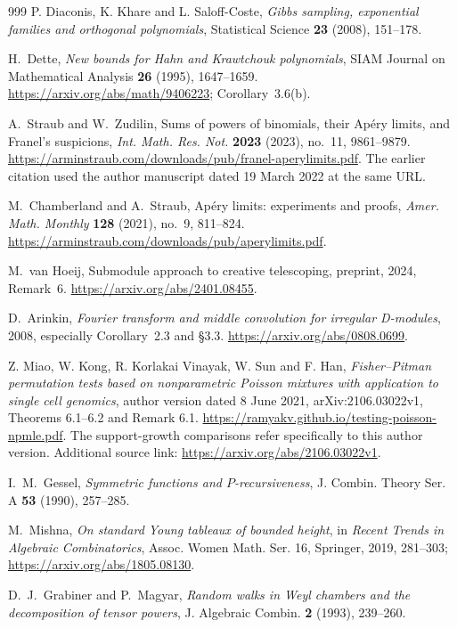 \documentclass[11pt,a4paper]{article}
\theoremstyle{definition}
\theoremstyle{remark}
\numberwithin{equation}{section}
\begin{document}
\begin{thebibliography}{999}
P. Diaconis, K. Khare and L. Saloff-Coste,
\emph{Gibbs sampling, exponential families and orthogonal polynomials},
Statistical Science \textbf{23} (2008), 151--178.

H.~Dette, \emph{New bounds for Hahn and Krawtchouk polynomials},
SIAM Journal on Mathematical Analysis \textbf{26} (1995), 1647--1659.
\url{https://arxiv.org/abs/math/9406223}; Corollary~3.6(b).

A.~Straub and W.~Zudilin, Sums of powers of binomials, their Ap\'ery
limits, and Franel's suspicions, \emph{Int. Math. Res. Not.}
\textbf{2023} (2023), no.~11, 9861--9879.
\url{https://arminstraub.com/downloads/pub/franel-aperylimits.pdf}.
The earlier citation used the author manuscript dated 19 March 2022 at the same URL.

M.~Chamberland and A.~Straub, Ap\'ery limits: experiments and proofs,
\emph{Amer. Math. Monthly} \textbf{128} (2021), no.~9, 811--824.
\url{https://arminstraub.com/downloads/pub/aperylimits.pdf}.

M.~van Hoeij, Submodule approach to creative telescoping,
preprint, 2024, Remark~6.
\url{https://arxiv.org/abs/2401.08455}.

D.~Arinkin, \emph{Fourier transform and middle convolution for irregular
D-modules}, 2008, especially Corollary~2.3 and \S3.3.
\url{https://arxiv.org/abs/0808.0699}.

Z. Miao, W. Kong, R. Korlakai Vinayak, W. Sun and F. Han,
\emph{Fisher--Pitman permutation tests based on nonparametric Poisson
mixtures with application to single cell genomics},
author version dated 8 June 2021, arXiv:2106.03022v1,
Theorems 6.1--6.2 and Remark 6.1.
\url{https://ramyakv.github.io/testing-poisson-npmle.pdf}.
The support-growth comparisons refer specifically to this author version.
Additional source link: \url{https://arxiv.org/abs/2106.03022v1}.

I.~M.~Gessel, \emph{Symmetric functions and $P$-recursiveness},
J. Combin. Theory Ser. A \textbf{53} (1990), 257--285.

M.~Mishna, \emph{On standard Young tableaux of bounded height},
in \emph{Recent Trends in Algebraic Combinatorics},
Assoc. Women Math. Ser. 16, Springer, 2019, 281--303;
\url{https://arxiv.org/abs/1805.08130}.

D.~J.~Grabiner and P.~Magyar,
\emph{Random walks in Weyl chambers and the decomposition of tensor powers},
J. Algebraic Combin. \textbf{2} (1993), 239--260.


\end{thebibliography}
\end{document}
